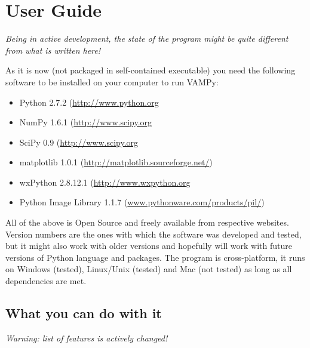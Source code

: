 
\section{User Guide}\label{userguide}

\emph{Being in active development, the state of the program might be quite different from what is written here!}

As it is now (not packaged in self-contained executable) you need the following software to be installed on your computer to run VAMPy:
\begin{itemize}
	\item Python 2.7.2 (\url{http://www.python.org}
	\item NumPy 1.6.1 (\url{http://www.scipy.org}
	\item SciPy 0.9 (\url{http://www.scipy.org}
	\item matplotlib 1.0.1 (\url{http://matplotlib.sourceforge.net/})
	\item wxPython 2.8.12.1 (\url{http://www.wxpython.org}
	\item Python Image Library 1.1.7 (\url{www.pythonware.com/products/pil/}) 
\end{itemize}
All of the above is Open Source and freely available from respective websites. Version numbers are the ones with which the software was developed and tested, but it might also work with older versions and hopefully will work with future versions of Python language and packages. The program is cross-platform, it runs on Windows (tested), Linux/Unix (tested) and Mac (not tested) as long as all dependencies are met.

\subsection{What you can do with it}\label{vampy-features}
\emph{Warning: list of features is actively changed!}


